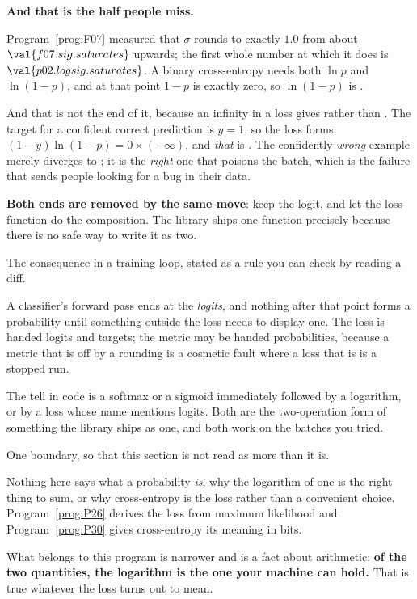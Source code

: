 \begin{fr}

\begin{trapbox}
\textbf{And that is the half people miss.}

Program~\ref{prog:F07} measured that $\sigma$ rounds to exactly
$\num{1.0}$ from about $\val{f07.sig.saturates}$ upwards; the first whole
number at which it does is $\val{p02.logsig.saturates}$. A binary cross-entropy
needs both $\ln p$ and $\ln(1 - p)$, and at that point $1 - p$ is exactly zero,
so $\ln(1 - p)$ is .

And that is not the end of it, because an infinity in a loss gives
 rather than . The target for a confident correct
prediction is $y = 1$, so the loss forms
$(1 - y)\ln(1 - p) = 0 \times (-\infty)$, and \emph{that} is . The
confidently \emph{wrong} example merely diverges to ; it is the
\emph{right} one that poisons the batch, which is the failure that sends
people looking for a bug in their data.

\textbf{Both ends are removed by the same move}: keep the logit, and let the
loss function do the composition. The library ships one function precisely
because there is no safe way to write it as two.
\end{trapbox}
\end{fr}

\begin{fr}
\begin{aibox}
The consequence in a training loop, stated as a rule you can check by reading
a diff.

A classifier's forward pass ends at the \emph{logits}, and nothing after that
point forms a probability until something outside the loss needs to display
one. The loss is handed logits and targets; the metric may be handed
probabilities, because a metric that is off by a rounding is a cosmetic fault
where a loss that is  is a stopped run.

The tell in code is a softmax or a sigmoid immediately followed by a
logarithm, or by a loss whose name mentions logits. Both are the two-operation
form of something the library ships as one, and both work on the batches you
tried.
\end{aibox}
\end{fr}

\begin{fr}
One boundary, so that this section is not read as more than it is.

Nothing here says what a probability \emph{is}, why the logarithm of one is the
right thing to sum, or why cross-entropy is the loss rather than a convenient
choice. Program~\ref{prog:P26} derives the loss from maximum likelihood and
Program~\ref{prog:P30} gives cross-entropy its meaning in bits.

What belongs to this program is narrower and is a fact about arithmetic:
\textbf{of the two quantities, the logarithm is the one your machine can hold.}
That is true whatever the loss turns out to mean.
\end{fr}


